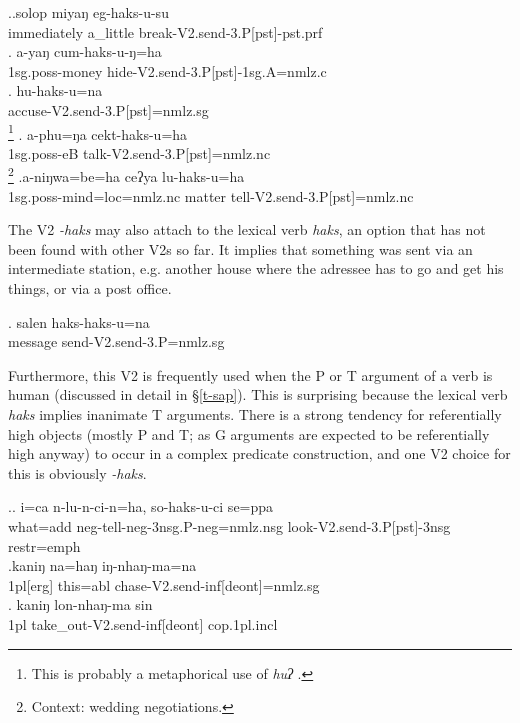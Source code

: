 \ex.\ag.solop miyaŋ eg-haks-u-su\\
immediately a\_little break{\sc -V2.send-3.P[pst]-pst.prf}\\
 
\bg. a-yaŋ cum-haks-u-ŋ=ha\\
{\sc 1sg.poss-}money hide{\sc -V2.send-3.P[pst]-1sg.A=nmlz.c}\\
\bg. hu-haks-u=na\\
accuse{\sc -V2.send-3.P[pst]=nmlz.sg}\\
\footnote{This is probably a metaphorical use of \emph{huʔ} .}
\bg. a-phu=ŋa cekt-haks-u=ha\\
{\sc 1sg.poss-}eB talk{\sc -V2.send-3.P[pst]=nmlz.nc}\\
\footnote{Context: wedding negotiations.} 
\bg.a-niŋwa=be=ha ceʔya lu-haks-u=ha\\
{\sc 1sg.poss-}mind{\sc =loc=nmlz.nc} matter tell{\sc -V2.send-3.P[pst]=nmlz.nc}\\


The V2 \emph{-haks} may also attach to the lexical verb \emph{haks}, an option that has not been found with other V2s so far. It implies that something was sent via an intermediate station, e.g. another house where the adressee has to go and get his things, or via a post office. 

\exg. salen haks-haks-u=na\\
message send{\sc -V2.send-3.P=nmlz.sg}\\


Furthermore, this V2 is frequently used when the P or T argument of a verb is human (discussed in detail in §\ref{t-sap}). This is surprising because the lexical verb \emph{haks}  implies inanimate T arguments. There is a strong tendency for referentially high objects (mostly P and T; as G arguments are expected to be referentially high anyway) to occur in a complex predicate construction, and one V2 choice for this is obviously \emph{-haks}.

\ex.\ag. i=ca n-lu-n-ci-n=ha, so-haks-u-ci se=ppa\\
what{\sc =add} {\sc neg-}tell{\sc -neg-3nsg.P-neg=nmlz.nsg}  look{\sc -V2.send-3.P[pst]-3nsg} {\sc restr=emph}\\
 
\bg.kaniŋ na=haŋ    iŋ-nhaŋ-ma=na\\
{\sc 1pl[erg]} this{\sc =abl} chase{\sc -V2.send-inf[deont]=nmlz.sg}\\
 
\bg. kaniŋ lon-nhaŋ-ma sin\\
{\sc 1pl} take\_out{\sc -V2.send-inf[deont]} {\sc cop.1pl.incl}\\

